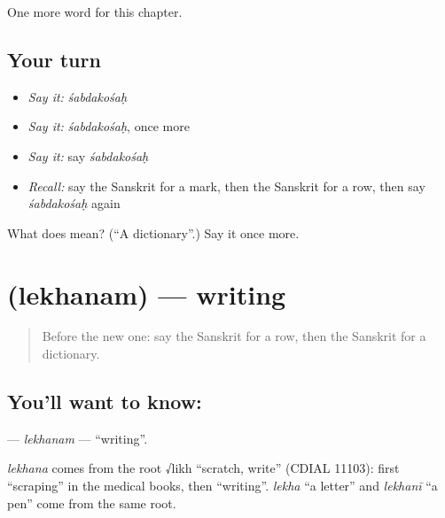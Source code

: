 \begin{grammarlens}[title={What you've built}]
One more word for this chapter.
\end{grammarlens}

\subsection*{Your turn}
\begin{itemize}
\raggedright
  \item \emph{Say it:} \emph{śabdakośaḥ}
  \item \emph{Say it:} \emph{śabdakośaḥ}, once more
  \item \emph{Say it:} say \emph{śabdakośaḥ}
  \item \emph{Recall:} say the Sanskrit for a mark, then the Sanskrit for a row, then say \emph{śabdakośaḥ} again
\end{itemize}

\begin{tcolorbox}[breakable,colback=teal!4,colframe=teal!35!black,title={Before you move on}]
What does  mean? (\textquotedblleft{}A dictionary\textquotedblright{}.) Say it once more.
\end{tcolorbox}
\section[\texorpdfstring{\sk{लेखनम्} (lekhanam)}{लेखनम् (lekhanam)}]{ (lekhanam) — writing}

\label{lesson:SA-C169-lekhanam}



\begin{quote}
Before the new one: say the Sanskrit for a row, then the Sanskrit for a dictionary.
\end{quote}

\subsection*{You'll want to know: }
\textbf{} — \emph{lekhanam} — \textquotedblleft{}writing\textquotedblright{}.

\begin{cousinweb}
\emph{lekhana} comes from the root √likh \textquotedblleft{}scratch, write\textquotedblright{} (CDIAL 11103): first \textquotedblleft{}scraping\textquotedblright{} in the medical books, then \textquotedblleft{}writing\textquotedblright{}. \emph{lekha} \textquotedblleft{}a letter\textquotedblright{} and \emph{lekhanī} \textquotedblleft{}a pen\textquotedblright{} come from the same root.
\end{cousinweb}


